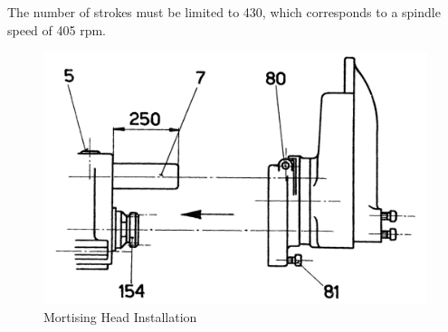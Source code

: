 The number of strokes must be limited to 430, which corresponds to a spindle speed of 405 rpm.

\begin{figure}[h]
    \centering
    \includegraphics[width=0.7\linewidth]{images/page_37}
    \caption{Mortising Head Installation}
    \label{fig:mortising_head_installation}
\end{figure}
